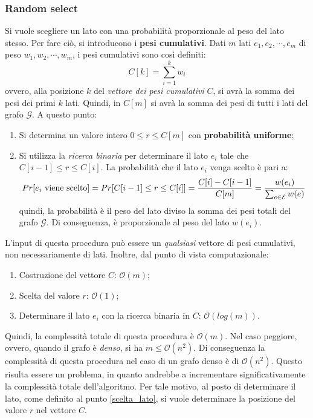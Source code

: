 \subsubsection*{Random select}
Si vuole scegliere un lato con una probabilità 
proporzionale al peso del lato stesso. Per fare ciò, si introducono i 
\textbf{pesi cumulativi}. Dati $m$ lati $e_1, e_2, \cdots , e_m$ di peso 
$w_1, w_2, \cdots , w_m$, i pesi cumulativi sono così definiti:
\[
    C[k] = \sum_{i = 1}^{k} w_i
\]
ovvero, alla posizione $k$ del \textit{vettore dei pesi cumulativi} $C$, si avrà 
la somma dei pesi dei primi $k$ lati. Quindi, in $C[m]$ si avrà la somma dei pesi 
di tutti i lati del grafo $\mathcal{G}$. A questo punto:
\begin{enumerate}
    \item Si determina un valore intero $0 \le r \le C[m]$ con 
    \textbf{probabilità uniforme};
    \item \label{scelta_lato} Si utilizza la \textit{ricerca binaria} per 
    determinare il lato $e_i$ tale che $C[i - 1] \le r \le C[i]$. La probabilità 
    che il lato $e_i$ venga scelto è pari a:
    \[
        Pr[e_i \textnormal{ viene scelto}] = Pr[C[i - 1] \le r \le C[i]] = \frac{C[i] - C[i - 1]}{C[m]} = \frac{w(e_i)}{\sum_{e \in \mathcal{E}} w(e)}
    \]
    quindi, la probabilità è il peso del lato diviso la somma dei pesi totali del 
    grafo $\mathcal{G}$. Di conseguenza, è proporzionale al peso del lato $w(e_i)$.
\end{enumerate}
L'input di questa procedura può essere un \textit{qualsiasi} vettore di pesi 
cumulativi, non necessariamente di lati. Inoltre, dal punto di vista computazionale:
\begin{enumerate}
    \item Costruzione del vettore $C$: $\mathcal{O}(m)$;
    \item Scelta del valore $r$: $\mathcal{O}(1)$;
    \item Determinare il lato $e_i$ con la ricerca binaria in $C$: 
    $\mathcal{O}(log(m))$.
\end{enumerate}
Quindi, la complessità totale di questa procedura è $\mathcal{O}(m)$. Nel caso 
peggiore, ovvero, quando il grafo è \textit{denso}, si ha $m \le \mathcal{O}(n^2)$. 
Di conseguenza la complessità di questa procedura nel caso di un grafo denso è di 
$\mathcal{O}(n^2)$. Questo risulta essere un problema, in quanto andrebbe a 
incrementare significativamente la complessità totale dell'algoritmo. Per tale 
motivo, al posto di determinare il lato, come definito al punto \ref{scelta_lato}, 
si vuole determinare la posizione del valore $r$ nel vettore $C$.

